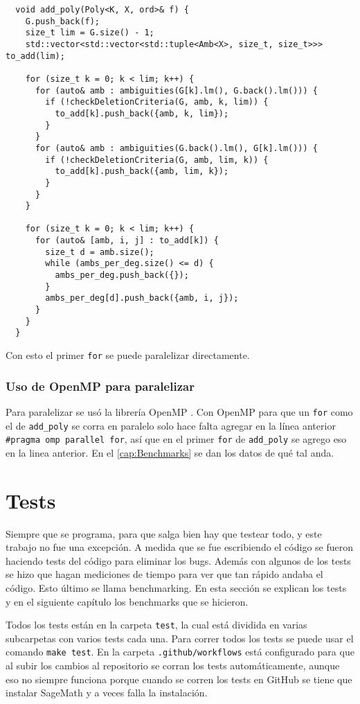 \documentclass[12pt]{report}
\theoremstyle{customstyle}
\theoremstyle{factstyle}
\begin{document}
\begin{verbatim}
  void add_poly(Poly<K, X, ord>& f) {
    G.push_back(f);
    size_t lim = G.size() - 1;
    std::vector<std::vector<std::tuple<Amb<X>, size_t, size_t>>> to_add(lim);

    for (size_t k = 0; k < lim; k++) {
      for (auto& amb : ambiguities(G[k].lm(), G.back().lm())) {
        if (!checkDeletionCriteria(G, amb, k, lim)) {
          to_add[k].push_back({amb, k, lim});
        }
      }
      for (auto& amb : ambiguities(G.back().lm(), G[k].lm())) {
        if (!checkDeletionCriteria(G, amb, lim, k)) {
          to_add[k].push_back({amb, lim, k});
        }
      }
    }

    for (size_t k = 0; k < lim; k++) {
      for (auto& [amb, i, j] : to_add[k]) {
        size_t d = amb.size();
        while (ambs_per_deg.size() <= d) {
          ambs_per_deg.push_back({});
        }
        ambs_per_deg[d].push_back({amb, i, j});
      }
    }
  }
\end{verbatim}

Con esto el primer \texttt{for} se puede paralelizar directamente.

\subsection{Uso de OpenMP para paralelizar}

Para paralelizar se usó la librería OpenMP \cite{lib:openmp}. Con OpenMP para que un \texttt{for} como el de \texttt{add\_poly} se corra en paralelo solo hace falta agregar en la línea anterior \texttt{\#pragma omp parallel for}, así que en el primer \texttt{for} de \texttt{add\_poly} se agrego eso en la linea anterior. En el \cref{cap:Benchmarks} se dan los datos de qué tal anda.

\chapter{Tests}

Siempre que se programa, para que salga bien hay que testear todo, y este trabajo no fue una excepción. A medida que se fue escribiendo el código se fueron haciendo tests del código para eliminar los bugs. Además con algunos de los tests se hizo que hagan mediciones de tiempo para ver que tan rápido andaba el código. Esto último se llama benchmarking. En esta sección se explican los tests y en el siguiente capítulo los benchmarks que se hicieron.

Todos los tests están en la carpeta \texttt{test}, la cual está dividida en varias subcarpetas con varios tests cada una. Para correr todos los tests se puede usar el comando \texttt{make test}. En la carpeta \texttt{.github/workflows} está configurado para que al subir los cambios al repositorio se corran los tests automáticamente, aunque eso no siempre funciona porque cuando se corren los tests en GitHub se tiene que instalar SageMath y a veces falla la instalación.
\end{document}
